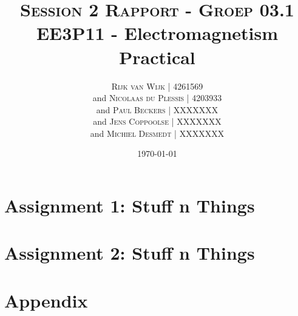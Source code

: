 \documentclass[11pt, a4paper, oneside]{article}
\title{\textsc{Session 2 Rapport - Groep 03.1}
	\newline \textbf{EE3P11 - Electromagnetism Practical}\\
}
\author{
	\textsc{Rijk van Wijk | 4261569}\\
	and
	\textsc{Nicolaas du Plessis | 4203933}\\
	and
	\textsc{Paul Beckers | XXXXXXX}\\
	and
	\textsc{Jens Coppoolse | XXXXXXX}\\
	and
	\textsc{Michiel Desmedt | XXXXXXX}\\
}
\date {\today}
\let\stdsection\section
\renewcommand\section{\newpage\stdsection}
\begin{document}
	\maketitle
	\thispagestyle{empty}
	\newpage
	
	\section*{Assignment 1: Stuff n Things}
	
	\section*{Assignment 2: Stuff n Things}
	

	\section*{Appendix}
	
\end{document}

